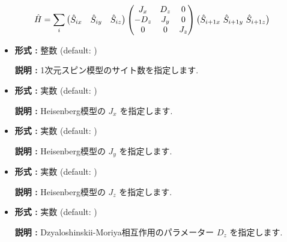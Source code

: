 \documentclass[letterpaper,10pt,dvipdfmx,openany]{sphinxmanual}
\begin{document}
\begin{gather}
\begin{split}\begin{align}
  {\hat H} = \sum_{i}
  \left(
  \begin{matrix}
    {\hat S}_{i x} & {\hat S}_{i y} & {\hat S}_{i z}
  \end{matrix}
  \right)
  \left(
  \begin{matrix}
    J_x & D_z & 0 \\
    -D_z & J_y & 0 \\
    0 & 0 & J_z
  \end{matrix}
  \right)
  \left(
  \begin{matrix}
    {\hat S}_{i+1 x} \ {\hat S}_{i+1 y} \ {\hat S}_{i+1 z}
  \end{matrix}
  \right)\end{align}\end{split}\notag
\end{gather}\begin{itemize}
\item {} 

\textbf{形式 :} 整数 (default: )

\textbf{説明 :} 1次元スピン模型のサイト数を指定します.

\item {} 

\textbf{形式 :} 実数 (default: )

\textbf{説明 :} Heisenberg模型の \(J_x\) を指定します.

\item {} 

\textbf{形式 :} 実数 (default: )

\textbf{説明 :} Heisenberg模型の \(J_y\) を指定します.

\item {} 

\textbf{形式 :} 実数 (default: )

\textbf{説明 :} Heisenberg模型の \(J_z\) を指定します.

\item {} 

\textbf{形式 :} 実数 (default: )

\textbf{説明 :}
Dzyaloshinskii-Moriya相互作用のパラメーター \(D_z\) を指定します.

\end{itemize}
\end{document}
